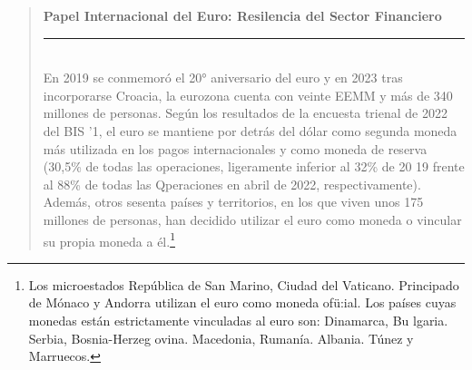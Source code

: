 \documentclass[10pt,a4paper]{article}
\newenvironment{specialblock}[1]{%
      \begin{quote} %
      \small %
      \noindent\textbf{#1}\\[-0.3em] %
      \rule{\linewidth}{0.4pt}\\[0.6em]}{
      \end{quote}}
\begin{document}
\begin{specialblock}{Papel Internacional del Euro: Resilencia del Sector Financiero}
    En 2019 se conmemoró el 20° aniversario del euro y en 2023 tras incorporarse Croacia, la eurozona cuenta con veinte EEMM y más de 340 millones de personas. Según los resultados de la encuesta trienal de 2022 del BIS '1, el euro se mantiene por detrás del dólar como segunda moneda más utilizada en los pagos internacionales y como moneda de reserva (30,5\% de todas las operaciones, ligeramente inferior al 32\% de 20 19 frente al 88\% de todas las Qperaciones en abril de 2022, respectivamente). Además, otros sesenta países y territorios, en los que viven unos 175 millones de personas, han decidido utilizar el euro como moneda o vincular su propia moneda a él.\footnote{
    Los microestados República de San Marino, Ciudad del Vaticano. Principado de Mónaco y Andorra utilizan el euro como moneda ofü:ial. Los países cuyas monedas están estrictamente vinculadas al euro son: Dinamarca, Bu lgaria. Serbia, Bosnia-Herzeg ovina. Macedonia, Rumanía. Albania. Túnez y Marruecos.
    }
        

\end{specialblock}
\end{document}
